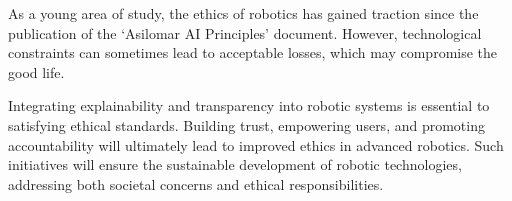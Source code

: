 As a young area of study, the ethics of robotics has gained traction since the publication of the ‘Asilomar AI Principles’ document. However, technological constraints can sometimes lead to acceptable losses, which may compromise the good life.

Integrating explainability and transparency into robotic systems is essential to satisfying ethical standards. Building trust, empowering users, and promoting accountability will ultimately lead to improved ethics in advanced robotics. Such initiatives will ensure the sustainable development of robotic technologies, addressing both societal concerns and ethical responsibilities.
